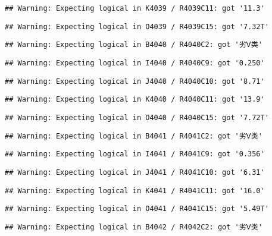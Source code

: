 \documentclass[
]{article}
\begin{document}
\begin{verbatim}
## Warning: Expecting logical in K4039 / R4039C11: got '11.3'
\end{verbatim}

\begin{verbatim}
## Warning: Expecting logical in O4039 / R4039C15: got '7.32T'
\end{verbatim}

\begin{verbatim}
## Warning: Expecting logical in B4040 / R4040C2: got '劣Ⅴ类'
\end{verbatim}

\begin{verbatim}
## Warning: Expecting logical in I4040 / R4040C9: got '0.250'
\end{verbatim}

\begin{verbatim}
## Warning: Expecting logical in J4040 / R4040C10: got '8.71'
\end{verbatim}

\begin{verbatim}
## Warning: Expecting logical in K4040 / R4040C11: got '13.9'
\end{verbatim}

\begin{verbatim}
## Warning: Expecting logical in O4040 / R4040C15: got '7.72T'
\end{verbatim}

\begin{verbatim}
## Warning: Expecting logical in B4041 / R4041C2: got '劣Ⅴ类'
\end{verbatim}

\begin{verbatim}
## Warning: Expecting logical in I4041 / R4041C9: got '0.356'
\end{verbatim}

\begin{verbatim}
## Warning: Expecting logical in J4041 / R4041C10: got '6.31'
\end{verbatim}

\begin{verbatim}
## Warning: Expecting logical in K4041 / R4041C11: got '16.0'
\end{verbatim}

\begin{verbatim}
## Warning: Expecting logical in O4041 / R4041C15: got '5.49T'
\end{verbatim}

\begin{verbatim}
## Warning: Expecting logical in B4042 / R4042C2: got '劣Ⅴ类'
\end{verbatim}
\end{document}
